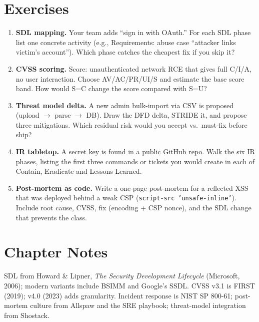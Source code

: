 \section{Exercises}
\label{sec:ch08-exercises}
\begin{enumerate}[label=E8.\arabic*, leftmargin=*, itemsep=0.6em]
    \item \textbf{SDL mapping.} Your team adds ``sign in with OAuth.'' For each SDL phase list one concrete activity (e.g., Requirements: abuse case ``attacker links victim's account''). Which phase catches the cheapest fix if you skip it?
    \item \textbf{CVSS scoring.} Score: unauthenticated network RCE that gives full C/I/A, no user interaction. Choose AV/AC/PR/UI/S and estimate the base score band. How would S=C change the score compared with S=U?
    \item \textbf{Threat model delta.} A new admin bulk-import via CSV is proposed (upload $\to$ parse $\to$ DB). Draw the DFD delta, STRIDE it, and propose three mitigations. Which residual risk would you accept vs.\ must-fix before ship?
    \item \textbf{IR tabletop.} A secret key is found in a public GitHub repo. Walk the six IR phases, listing the first three commands or tickets you would create in each of Contain, Eradicate and Lessons Learned.
    \item \textbf{Post-mortem as code.} Write a one-page post-mortem for a reflected XSS that was deployed behind a weak CSP (\texttt{script-src 'unsafe-inline'}). Include root cause, CVSS, fix (encoding + CSP nonce), and the SDL change that prevents the class.
\end{enumerate}

\section*{Chapter Notes}
SDL from Howard \& Lipner, \emph{The Security Development Lifecycle} (Microsoft, 2006); modern variants include BSIMM and Google's SSDL. CVSS v3.1 is FIRST (2019); v4.0 (2023) adds granularity. Incident response is NIST SP 800-61; post-mortem culture from Allspaw and the SRE playbook; threat-model integration from Shostack.

